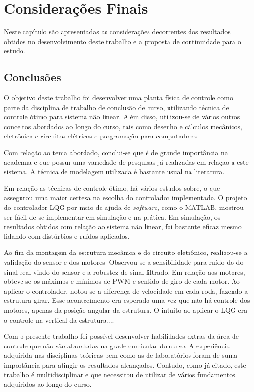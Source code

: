 \chapter{Considerações Finais}

Neste capítulo são apresentadas as considerações decorrentes dos resultados obtidos no desenvolvimento deste trabalho e a proposta de continuidade para o estudo.

\section{Conclusões}

O objetivo deste trabalho foi desenvolver uma planta física de controle como parte da disciplina de trabalho de conclusão de curso, utilizando técnica de controle ótimo para sistema não linear. Além disso, utilizou-se de vários outros conceitos abordados ao longo do curso, tais como desenho e cálculos mecânicos, eletrônica e circuitos elétricos e programação para computadores.

Com relação ao tema abordado, conclui-se que é de grande importância na academia e que possui uma variedade de pesquisas já realizadas em relação a este sistema. A técnica de modelagem utilizada é bastante usual na literatura.

Em relação as técnicas de controle ótimo, há vários estudos sobre, o que assegurou uma maior certeza na escolha do controlador implementado. O projeto do controlador LQG por meio de ajuda de \textit{software}, como o MATLAB, mostrou ser fácil de se implementar em simulação e na prática. Em simulação, os resultados obtidos com relação ao sistema não linear, foi bastante eficaz mesmo lidando com distúrbios e ruídos aplicados.

Ao fim da montagem da estrutura mecânica e do circuito eletrônico, realizou-se a validação do sensor e dos motores. Observou-se a sensibilidade para ruído do do sinal real vindo do sensor e a robustez do sinal filtrado. Em relação aos motores, obteve-se os máximos e mínimos de PWM e sentido de giro de cada motor.
Ao aplicar o controlador, notou-se a diferença de velocidade em cada roda, fazendo a estrutura girar. Esse acontecimento era esperado uma vez que não há controle dos motores, apenas da posição angular da estrutura. O intuito ao aplicar o LQG era o controle na vertical da estrutura....

Com o presente trabalho foi possível desenvolver habilidades extras da área de controle que não são abordadas na grade curricular do curso. A experiência adquirida nas disciplinas teóricas bem como as de laboratórios foram de
suma importância para atingir os resultados alcançados. Contudo, como já citado, este trabalho é multidisciplinar e que necessitou de utilizar de vários fundamentos adquiridos ao longo do curso.



